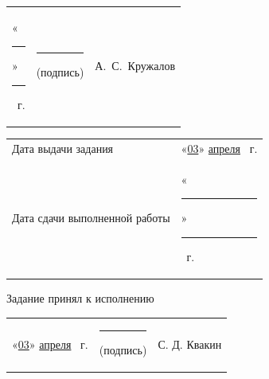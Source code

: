 \documentclass[14pt, a4paper]{extarticle}
\begin{document}
{
\renewcommand{\arraystretch}{2}
\noindent
\begin{tabularx}{\textwidth}{@{} P{0.45\textwidth} P{0.3\textwidth} P{0.25\textwidth} @{}}

    «\rule{0.8cm}{0.4pt}» \quad \rule{2cm}{0.4pt} ~г. &
    \centering \rule{3.5cm}{0.4pt} \par \footnotesize (подпись) &
    \hfill А.~С.~Кружалов                                         \\
\end{tabularx}

\begin{tabularx}{\textwidth}{@{} P{0.45\textwidth} P{0.55\textwidth} @{}}
    Дата выдачи задания           &
    \hfill «\underline{03}» \quad \underline{апреля} ~г. \\

    Дата сдачи выполненной работы &
    \hfill «\rule{0.8cm}{0.4pt}» \quad \rule{2cm}{0.4pt} ~г. \\
\end{tabularx}
}

Задание принял к исполнению

{
\renewcommand{\arraystretch}{1.5}
\begin{tabularx}{\textwidth}{@{} P{0.45\textwidth} P{0.3\textwidth} P{0.25\textwidth} @{}}

    «\underline{03}» \quad \underline{апреля} ~г. &
    \centering \rule{3.5cm}{0.4pt} \par \footnotesize (подпись) &
    \hfill С. Д. Квакин                                            \\
\end{tabularx}
}
\end{document}
